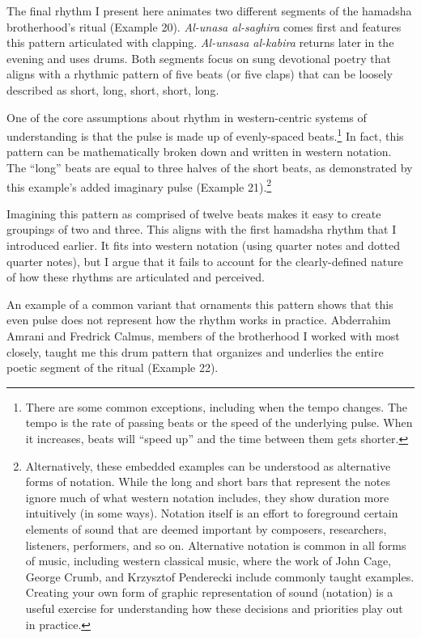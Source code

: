 \documentclass[twoside]{article}
\begin{document}
The final rhythm I present here animates two different segments of the
hamadsha brotherhood's ritual (Example 20). \emph{Al-unasa al-saghira} comes first
and features this pattern articulated with clapping. \emph{Al-unsasa
al-kabira} returns later in the evening and uses drums. Both segments
focus on sung devotional poetry that aligns with a rhythmic pattern of
five beats (or five claps) that can be loosely described as short, long,
short, short, long.

One of the core assumptions about rhythm in western-centric systems of
understanding is that the pulse is made up of evenly-spaced
beats.\footnote{There are some common exceptions, including when the
  tempo changes. The tempo is the rate of passing beats or the speed of
  the underlying pulse. When it increases, beats will ``speed up'' and
  the time between them gets shorter.} In fact, this pattern can be
mathematically broken down and written in western notation. The ``long''
beats are equal to three halves of the short beats, as demonstrated by
this example's added imaginary pulse (Example 21).\footnote{Alternatively, these
  embedded examples can be understood as alternative forms of notation.
  While the long and short bars that represent the notes ignore much of
  what western notation includes, they show duration more intuitively
  (in some ways). Notation itself is an effort to foreground certain
  elements of sound that are deemed important by composers, researchers,
  listeners, performers, and so on. Alternative notation is common in
  all forms of music, including western classical music, where the work
  of John Cage, George Crumb, and Krzysztof Penderecki include commonly
  taught examples. Creating your own form of graphic representation of
  sound (notation) is a useful exercise for understanding how these
  decisions and priorities play out in practice.}

Imagining this pattern as comprised of twelve beats makes it easy to
create groupings of two and three. This aligns with the first hamadsha
rhythm that I introduced earlier. It fits into western notation (using
quarter notes and dotted quarter notes), but I argue that it fails to
account for the clearly-defined nature of how these rhythms are
articulated and perceived.

An example of a common variant that ornaments this pattern shows that
this even pulse does not represent how the rhythm works in practice.
Abderrahim Amrani and Fredrick Calmus, members of the brotherhood I
worked with most closely, taught me this drum pattern that organizes and
underlies the entire poetic segment of the ritual (Example 22).
\end{document}
